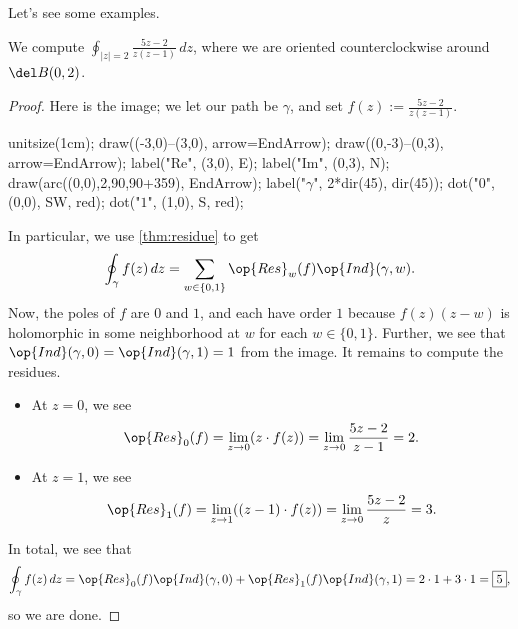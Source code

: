 Let's see some examples.
\begin{exe}
	We compute $\oint_{|z|=2}\frac{5z-2}{z(z-1)}\,dz$, where we are oriented counterclockwise around $\del B(0,2)$.
\end{exe}
\begin{proof}
	Here is the image; we let our path be $\gamma$, and set $f(z):=\frac{5z-2}{z(z-1)}$.
	\begin{center}
		\begin{asy}
			unitsize(1cm);
			draw((-3,0)--(3,0), arrow=EndArrow);
			draw((0,-3)--(0,3), arrow=EndArrow);
			label("$\textrm{Re}$", (3,0), E);
			label("$\textrm{Im}$", (0,3), N);
			draw(arc((0,0),2,90,90+359), EndArrow);
			label("$\gamma$", 2*dir(45), dir(45));
			dot("$0$", (0,0), SW, red);
			dot("$1$", (1,0), S, red);
		\end{asy}
	\end{center}
	In particular, we use \autoref{thm:residue} to get
	\[\oint_{\gamma}f(z)\,dz=\sum_{w\in\{0,1\}}\op{Res}_w(f)\op{Ind}(\gamma,w).\]
	Now, the poles of $f$ are $0$ and $1$, and each have order $1$ because $f(z)(z-w)$ is holomorphic in some neighborhood at $w$ for each $w\in\{0,1\}$. Further, we see that $\op{Ind}(\gamma,0)=\op{Ind}(\gamma,1)=1$ from the image. It remains to compute the residues.
	\begin{itemize}
		\item At $z=0$, we see
		\[\op{Res}_0(f)=\lim_{z\to0}(z\cdot f(z))=\lim_{z\to0}\frac{5z-2}{z-1}=2.\]
		\item At $z=1$, we see
		\[\op{Res}_1(f)=\lim_{z\to1}((z-1)\cdot f(z))=\lim_{z\to0}\frac{5z-2}z=3.\]
	\end{itemize}
	In total, we see that
	\[\oint_\gamma f(z)\,dz=\op{Res}_0(f)\op{Ind}(\gamma,0)+\op{Res}_1(f)\op{Ind}(\gamma,1)=2\cdot1+3\cdot1=\boxed5,\]
	so we are done.
\end{proof}